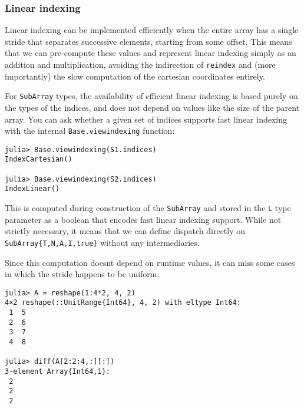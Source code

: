 \hypertarget{18413909182716267462}{}


\subsubsection{Linear indexing}



Linear indexing can be implemented efficiently when the entire array has a single stride that separates successive elements, starting from some offset. This means that we can pre-compute these values and represent linear indexing simply as an addition and multiplication, avoiding the indirection of \texttt{reindex} and (more importantly) the slow computation of the cartesian coordinates entirely.



For \texttt{SubArray} types, the availability of efficient linear indexing is based purely on the types of the indices, and does not depend on values like the size of the parent array. You can ask whether a given set of indices supports fast linear indexing with the internal \texttt{Base.viewindexing} function:




\begin{verbatim}
julia> Base.viewindexing(S1.indices)
IndexCartesian()

julia> Base.viewindexing(S2.indices)
IndexLinear()
\end{verbatim}



This is computed during construction of the \texttt{SubArray} and stored in the \texttt{L} type parameter as a boolean that encodes fast linear indexing support. While not strictly necessary, it means that we can define dispatch directly on \texttt{SubArray\{T,N,A,I,true\}} without any intermediaries.



Since this computation doesn{\textquotesingle}t depend on runtime values, it can miss some cases in which the stride happens to be uniform:




\begin{verbatim}
julia> A = reshape(1:4*2, 4, 2)
4×2 reshape(::UnitRange{Int64}, 4, 2) with eltype Int64:
 1  5
 2  6
 3  7
 4  8

julia> diff(A[2:2:4,:][:])
3-element Array{Int64,1}:
 2
 2
 2
\end{verbatim}



